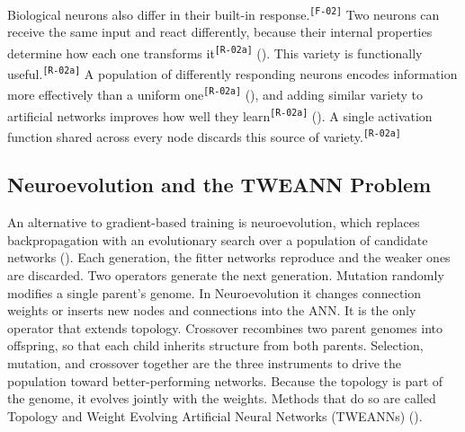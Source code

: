 \documentclass[12pt]{article}
\newcommand{\cohID}[1]{\textsuperscript{\scriptsize\texttt{[#1]}}}
\newcommand{\cohRepeat}[2]{\textcolor{cohRepeat}{#2}\cohID{#1}}
\newcommand{\cohFlow}[2]{\textcolor{cohFlow}{#2}\cohID{#1}}
\begin{document}
\cohFlow{F-02}{Biological neurons also differ in their built-in response.}
\cohRepeat{R-02a}{Two neurons can receive the same input and react differently, because their internal properties determine how each one transforms it} (\cite{drion_ion_2015}).
\cohRepeat{R-02a}{This variety is functionally useful.}
\cohRepeat{R-02a}{A population of differently responding neurons encodes information more effectively than a uniform one} (\cite{tripathy_intermediate_2013}), \cohRepeat{R-02a}{and adding similar variety to artificial networks improves how well they learn} (\cite{perez-nieves_neural_2021}).
\cohRepeat{R-02a}{A single activation function shared across every node discards this source of variety.}



\subsection{Neuroevolution and the TWEANN Problem}
\label{subsec:neuroevolution}


An alternative to gradient-based training is neuroevolution, which replaces backpropagation with an evolutionary search over a population of candidate networks (\cite{stanley_designing_2019}).
Each generation, the fitter networks reproduce and the weaker ones are discarded.
Two operators generate the next generation.
Mutation randomly modifies a single parent's genome. In Neuroevolution it changes connection weights or inserts new nodes and connections into the ANN. It is the only operator that extends topology.
Crossover recombines two parent genomes into offspring, so that each child inherits structure from both parents.
Selection, mutation, and crossover together are the three instruments to drive the population toward better-performing networks.
Because the topology is part of the genome, it evolves jointly with the weights. Methods that do so are called Topology and Weight Evolving Artificial Neural Networks (TWEANNs) (\cite{stanley_evolving_2002}).
\end{document}
